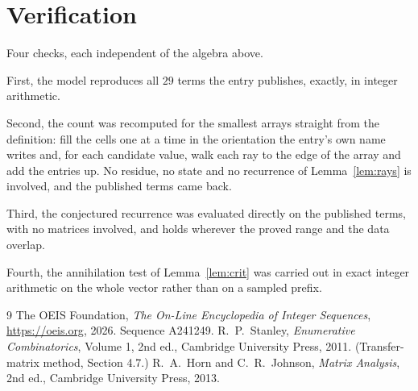 \documentclass[11pt,a4paper]{article}
\theoremstyle{plain}
\theoremstyle{definition}
\begin{document}
\section{Verification}

Four checks, each independent of the algebra above.

First, the model reproduces all $29$ terms the entry publishes, exactly, in integer
arithmetic.

Second, the count was recomputed for the smallest arrays straight from the definition: fill the
cells one at a time in the orientation the entry's own name writes and, for each candidate
value, walk each ray to the edge of the array and add the entries up. No residue, no state and
no recurrence of Lemma~\ref{lem:rays} is involved, and the published terms came back.

Third, the conjectured recurrence was evaluated directly on the published terms, with no
matrices involved, and holds wherever the proved range and the data overlap.

Fourth, the annihilation test of Lemma~\ref{lem:crit} was carried out in exact integer
arithmetic on the whole vector rather than on a sampled prefix.

\begin{thebibliography}{9}
 The OEIS Foundation, \emph{The On-Line Encyclopedia of Integer
Sequences}, \url{https://oeis.org}, 2026. Sequence A241249.
 R.~P.~Stanley, \emph{Enumerative Combinatorics}, Volume 1, 2nd ed.,
Cambridge University Press, 2011. (Transfer-matrix method, Section 4.7.)
 R.~A.~Horn and C.~R.~Johnson, \emph{Matrix Analysis}, 2nd ed., Cambridge
University Press, 2013.
\end{thebibliography}
\end{document}
